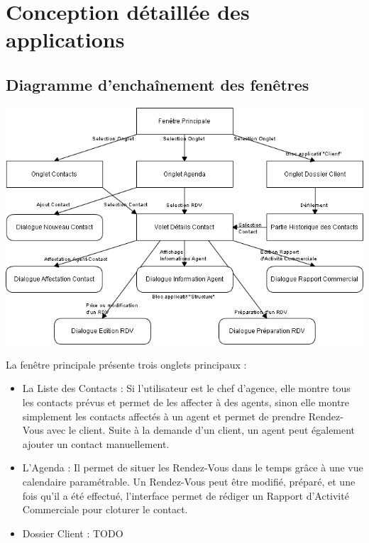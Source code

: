 
\section{Conception détaillée des applications}

\subsection{Diagramme d'enchaînement des fenêtres}

\begin {center}
\includegraphics[width=\textwidth]{diagramme-edf.png}
\end {center}

La fenêtre principale présente trois onglets principaux :

\begin{itemize}
\item La Liste des Contacts : Si l'utilisateur est le chef d'agence, elle montre tous les contacts prévus et permet de les affecter à des agents, sinon elle montre simplement les contacts affectés à un agent et permet de prendre Rendez-Vous avec le client. Suite à la demande d'un client, un agent peut également ajouter un contact manuellement.
\item L'Agenda : Il permet de situer les Rendez-Vous dans le temps grâce à une vue calendaire paramétrable. Un Rendez-Vous peut être modifié, préparé, et une fois qu'il a été effectué, l'interface permet de rédiger un Rapport d'Activité Commerciale pour cloturer le contact.
\item Dossier Client : TODO
\end{itemize}